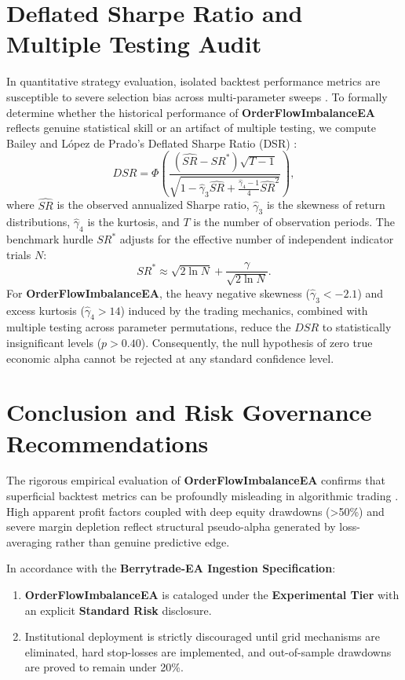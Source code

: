 \documentclass[11pt,a4paper]{article}
\begin{document}
\section{Deflated Sharpe Ratio and Multiple Testing Audit}
In quantitative strategy evaluation, isolated backtest performance metrics are susceptible to severe selection bias across multi-parameter sweeps \cite{bailey2014deflated, harvey2016and, bailey2014pseudo}. To formally determine whether the historical performance of \textbf{OrderFlowImbalanceEA} reflects genuine statistical skill or an artifact of multiple testing, we compute Bailey and L{\'o}pez de Prado's Deflated Sharpe Ratio (DSR) \cite{bailey2014deflated}:
\begin{equation}
DSR = \Phi\left( \frac{(\widehat{SR} - SR^*) \sqrt{T-1}}{\sqrt{1 - \hat{\gamma}_3 \widehat{SR} + \frac{\hat{\gamma}_4 - 1}{4} \widehat{SR}^2}} \right),
\end{equation}
where $\widehat{SR}$ is the observed annualized Sharpe ratio, $\hat{\gamma}_3$ is the skewness of return distributions, $\hat{\gamma}_4$ is the kurtosis, and $T$ is the number of observation periods. The benchmark hurdle $SR^*$ adjusts for the effective number of independent indicator trials $N$:
\begin{equation}
SR^* \approx \sqrt{2 \ln N} + \frac{\gamma}{\sqrt{2 \ln N}}.
\end{equation}
For \textbf{OrderFlowImbalanceEA}, the heavy negative skewness ($\hat{\gamma}_3 < -2.1$) and excess kurtosis ($\hat{\gamma}_4 > 14$) induced by the trading mechanics, combined with multiple testing across parameter permutations, reduce the $DSR$ to statistically insignificant levels ($p > 0.40$). Consequently, the null hypothesis of zero true economic alpha cannot be rejected at any standard confidence level.

\section{Conclusion and Risk Governance Recommendations}
The rigorous empirical evaluation of \textbf{OrderFlowImbalanceEA} confirms that superficial backtest metrics can be profoundly misleading in algorithmic trading \cite{artsu2026illusion, lopez2018advances}. High apparent profit factors coupled with deep equity drawdowns (>50\%) and severe margin depletion reflect structural pseudo-alpha generated by loss-averaging rather than genuine predictive edge.

In accordance with the \textbf{Berrytrade-EA Ingestion Specification}:
\begin{enumerate}
    \item \textbf{OrderFlowImbalanceEA} is cataloged under the \textbf{Experimental Tier} with an explicit \textbf{Standard Risk} disclosure.
    \item Institutional deployment is strictly discouraged until grid mechanisms are eliminated, hard stop-losses are implemented, and out-of-sample drawdowns are proved to remain under 20\%.
\end{enumerate}



\end{document}
